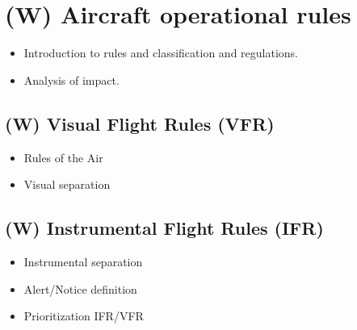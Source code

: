 \section{(W) Aircraft operational rules}\label{sec:AircraftOperationRules}
\begin{itemize}
    \item Introduction to rules and classification and regulations.
    \item Analysis of impact.
\end{itemize}

\subsection{(W) Visual Flight Rules (VFR)}\label{sec:VisualFlightRules}
\begin{itemize}
    \item Rules of the Air
    \item Visual separation
\end{itemize}

\subsection{(W) Instrumental Flight Rules (IFR)}\label{sec:InstrumentalFlightRules}
\begin{itemize}
    \item Instrumental separation
    \item Alert/Notice definition
    \item Prioritization IFR/VFR
\end{itemize}